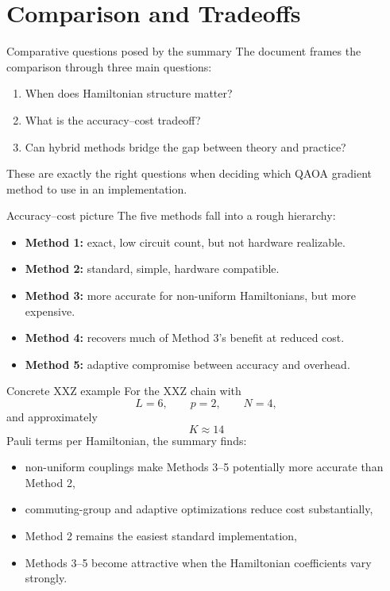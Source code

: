 \documentclass[aspectratio=169]{beamer}
\begin{document}
\section{Comparison and Tradeoffs}

\begin{frame}{Comparative questions posed by the summary}
The document frames the comparison through three main questions:
\begin{enumerate}
\item When does Hamiltonian structure matter?
\item What is the accuracy--cost tradeoff?
\item Can hybrid methods bridge the gap between theory and practice?
\end{enumerate}

These are exactly the right questions when deciding which QAOA gradient method to use in an implementation.
\end{frame}

\begin{frame}{Accuracy--cost picture}
The five methods fall into a rough hierarchy:

\begin{itemize}
\item \textbf{Method 1:} exact, low circuit count, but not hardware realizable.
\item \textbf{Method 2:} standard, simple, hardware compatible.
\item \textbf{Method 3:} more accurate for non-uniform Hamiltonians, but more expensive.
\item \textbf{Method 4:} recovers much of Method 3's benefit at reduced cost.
\item \textbf{Method 5:} adaptive compromise between accuracy and overhead.
\end{itemize}
\end{frame}

\begin{frame}{Concrete XXZ example}
For the XXZ chain with
\[
L=6,\qquad p=2,\qquad N=4,
\]
and approximately
\[
K \approx 14
\]
Pauli terms per Hamiltonian, the summary finds:

\begin{itemize}
\item non-uniform couplings make Methods 3--5 potentially more accurate than Method 2,
\item commuting-group and adaptive optimizations reduce cost substantially,
\item Method 2 remains the easiest standard implementation,
\item Methods 3--5 become attractive when the Hamiltonian coefficients vary strongly.
\end{itemize}
\end{frame}
\end{document}
